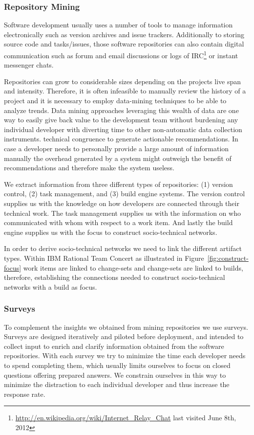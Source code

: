 \subsubsection{Repository Mining}
Software development usually uses a number of tools to manage information electronically such as version archives and issue trackers.
Additionally to storing source code and tasks/issues, those software repositories can also contain digital communication such as forum and email discussions or logs of IRC\footnote{\url{http://en.wikipedia.org/wiki/Internet_Relay_Chat} last visited June 8th, 2012} or instant messenger chats.

Repositories can grow to considerable sizes depending on the projects live span and intensity. 
Therefore, it is often infeasible to manually review the history of a project and it is necessary to employ data-mining techniques to be able to analyze trends.
Data mining approaches leveraging this wealth of data are one way to easily give back value to the development team without burdening any individual developer with diverting time to other non-automatic data collection instruments.
technical congruence to generate actionable recommendations.
In case a developer needs to personally provide a large amount of information manually the overhead generated by a system might outweigh the benefit of recommendations and therefore make the system useless.

We extract information from three different types of repositories: (1) version control, (2) task management, and (3) build engine systems.
The version control supplies us with the knowledge on how developers are connected through their technical work.
The task management supplies us with the information on who communicated with whom with respect to a work item.
And lastly the build engine supplies us with the focus to construct socio-technical networks.

In order to derive socio-technical networks we need to link the different artifact types.
Within IBM Rational Team Concert as illustrated in Figure~\ref{fig:construct-focus} work items are linked to change-sets and change-sets are linked to builds, therefore, establishing the connections needed to construct socio-technical networks with a build as focus.

\subsubsection{Surveys}
To complement the insights we obtained from mining repositories we use surveys.
Surveys are designed iteratively and piloted before deployment, and intended to collect input to enrich and clarify information obtained from the software repositories. 
With each survey we try to minimize the time each developer needs to spend completing them, which usually limits ourselves to focus on closed questions offering prepared answers.
We constrain ourselves in this way to minimize the distraction to each individual developer and thus increase the response rate.

